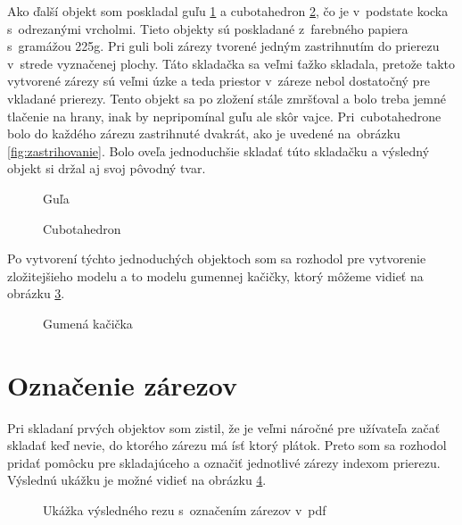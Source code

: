 Ako ďalší objekt som poskladal guľu \ref{fig:gula} a cubotahedron \ref{fig:cubotahedron}, čo je v~podstate kocka s~odrezanými vrcholmi. Tieto objekty sú poskladané z~farebného papiera s~gramážou 225g. Pri guli boli zárezy tvorené jedným zastrihnutím do prierezu v~strede vyznačenej plochy. Táto skladačka sa veľmi ťažko skladala, pretože takto vytvorené zárezy sú veľmi úzke a teda priestor v~záreze nebol dostatočný pre vkladané prierezy. Tento objekt sa po zložení stále zmršťoval a bolo treba jemné tlačenie na hrany, inak by nepripomínal guľu ale skôr vajce. Pri~cubotahedrone bolo do každého zárezu zastrihnuté dvakrát, ako je uvedené na~obrázku \ref{fig:zastrihovanie}. Bolo oveľa jednoduchšie skladať túto skladačku a výsledný objekt si držal aj svoj pôvodný tvar. 


\begin{figure}[!h]
\centering
{}\quad
{}
\caption{Guľa}\label{fig:gula}
\end{figure}

\begin{figure}[!h]
\centering
{}\quad
{}
\caption{Cubotahedron}\label{fig:cubotahedron}
\end{figure}

Po vytvorení týchto jednoduchých objektoch som sa rozhodol pre vytvorenie zložitejšieho modelu a to modelu gumennej kačičky, ktorý môžeme vidieť na obrázku \ref{fig:duck}.
\begin{figure}[!h]
\centering
{}\quad
{}
\caption{Gumená kačička}\label{fig:duck}
\end{figure}
\section{Označenie zárezov}
Pri skladaní prvých objektov som zistil, že je veľmi náročné pre užívateľa začať skladať keď nevie, do ktorého zárezu má ísť ktorý plátok. Preto som sa rozhodol pridať pomôcku pre skladajúceho a označiť jednotlivé zárezy indexom prierezu. Výslednú ukážku je možné vidieť na obrázku \ref{fig:OznaceneZarezy}.
\begin{figure}[!h]
\centering
{}
\caption{Ukážka výsledného rezu s~označením zárezov v~pdf}
\label{fig:OznaceneZarezy}
\end{figure}

